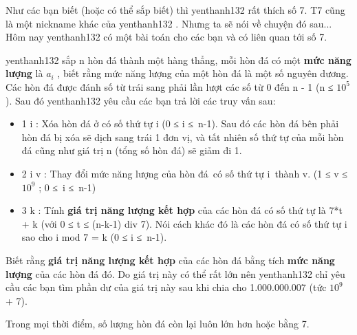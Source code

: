 Như các bạn biết (hoặc có thể sắp biết) thì   yenthanh132   rất thích số 7.   T7   cũng là một nickname khác của   yenthanh132   . Nhưng ta sẽ nói về chuyện đó sau... Hôm nay   yenthanh132   có một bài toán cho các bạn và có liên quan tới số 7.  

yenthanh132   sắp n hòn đá thành một hàng thẳng, mỗi hòn đá có một   \textbf{    mức năng lượng   }   là $a_{i}$   , biết rằng mức năng lượng của một hòn đá là một số nguyên dương. Các hòn đá được đánh số từ trái sang phải lần lượt các số từ 0 đến n - 1 (n ≤ $10^{5}$   ). Sau đó   yenthanh132   yêu cầu các bạn trả lời các truy vấn sau:  
\begin{itemize}
	\item     1 i : Xóa hòn đá ở có số thứ tự i (0 ≤ i ≤ n-1). Sau đó các hòn đá bên phải hòn đá bị xóa sẽ dịch sang trái 1 đơn vị, và tất nhiên số thứ tự của mỗi hòn đá cũng như giá trị n (tổng số hòn đá) sẽ giảm đi 1.   
	\item     2 i v : Thay đổi mức năng lượng của hòn đá có số thứ tự i thành v. (1 ≤ v ≤ $10^{9}$    ; 0 ≤ i ≤ n-1)   
	\item     3 k : Tính    \textbf{     giá trị năng lượng kết hợp    }    của các hòn đá có số thứ tự là 7*t + k (với 0 ≤ t ≤ (n-k-1) div 7). Nói cách khác đó là các hòn đá có số thứ tự i sao cho i mod 7 = k (0 ≤ i ≤ n-1).   
\end{itemize}

   Biết rằng   \textbf{    giá trị năng lượng kết hợp   }   của các hòn đá bằng tích   \textbf{    mức năng lượng   }   của các hòn đá đó. Do giá trị này có thể rất lớn nên   yenthanh132   chỉ yêu cầu các bạn tìm phần dư của giá trị này sau khi chia cho 1.000.000.007 (tức $10^{9}$   + 7).  

   Trong mọi thời điểm, số lượng hòn đá còn lại luôn lớn hơn hoặc bằng 7.